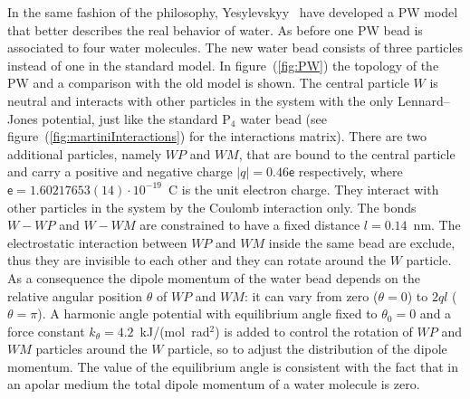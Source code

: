 In the same fashion of the \martini philosophy, Yesylevskyy \etal\, \cite{PW} have developed a \acf{PW} model 
that better describes the real behavior of water. As before one \ac{PW} bead is associated to four water 
molecules. The new water bead consists of three particles instead of one in the standard \martini model. In 
figure~(\ref{fig:PW}) the topology of the \ac{PW} and a comparison with the old model is shown. The central 
particle $W$ is neutral and interacts with other particles in the system with the only Lennard--Jones potential, 
just like the standard P$_4$ water bead (see figure~(\ref{fig:martiniInteractions}) for the interactions matrix). 
There are two additional particles, namely $WP$ and $WM$, that are bound to the central particle and carry a 
positive and negative charge $|q| = 0.46\mathsf{e}$ respectively, where 
$\mathsf{e} = 1.60217653(14) \cdot 10^{-19}$~C is the unit electron charge. They interact with other particles in 
the system by the Coulomb interaction only. The bonds $W-WP$ and $W-WM$ are constrained to have a fixed distance 
$l = 0.14$~nm. The electrostatic interaction between $WP$ and $WM$ inside the same bead are exclude, thus they 
are invisible to each other and they can rotate around the $W$ particle. As a consequence the dipole momentum of 
the water bead depends on the relative angular position $\theta$ of $WP$ and $WM$: it can vary from zero 
($\theta = 0$) to $2ql$ ($\theta = \pi$). A harmonic angle potential with equilibrium angle fixed to 
$\theta_0 = 0$ and a force constant $k_\theta = 4.2$~kJ/(mol\ rad$^2$) is added to control the rotation of 
$WP$ and $WM$ particles around the $W$ particle, so to adjust the distribution of the dipole momentum. The value 
of the equilibrium angle is consistent with the fact that in an apolar medium the total dipole momentum of a 
water molecule is zero. 


